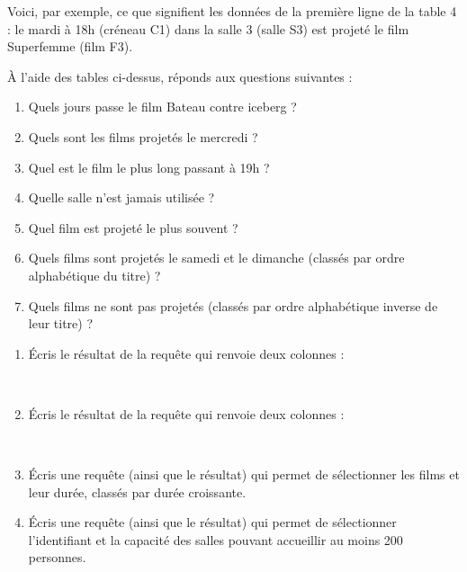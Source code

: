 \documentclass[class=report,crop=false, 12pt]{standalone}
\begin{document}
\bigskip

Voici, par exemple, ce que signifient les données de la première ligne de la table 4 :
le mardi à 18h (créneau C1) dans la salle 3 (salle S3) est projeté le film \og Superfemme \fg{} (film F3).


\bigskip

\begin{activite}
À l'aide des tables ci-dessus, réponds aux questions suivantes :
 \begin{enumerate}
  \item Quels jours passe le film \og Bateau contre iceberg \fg{} ?
  \item Quels sont les films projetés le mercredi ?
  \item Quel est le film le plus long passant à 19h ?
  \item Quelle salle n'est jamais utilisée ?
  \item Quel film est projeté le plus souvent ?
  \item Quels films sont projetés le samedi et le dimanche (classés par ordre alphabétique du titre) ?
  \item Quels films ne sont pas projetés (classés par ordre alphabétique inverse de leur titre) ?
  
\end{enumerate}

\end{activite}



\begin{activite}
\sauteligne

\begin{enumerate}
  \item  Écris le résultat de la requête qui renvoie deux colonnes :
  
  \indentation{} \\
      \indentation\indentation{}
          
          
  \item Écris le résultat de la requête qui renvoie deux colonnes :
  
  \indentation{}  \\
  \indentation\indentation{}  
    
   
  \item Écris une requête (ainsi que le résultat) qui permet de sélectionner les films et leur durée, classés par durée croissante.
  
  \item Écris une requête (ainsi que le résultat) qui permet de sélectionner l'identifiant et la capacité des salles pouvant accueillir au moins 200 personnes.
    
\end{enumerate}

\end{activite}
\end{document}
